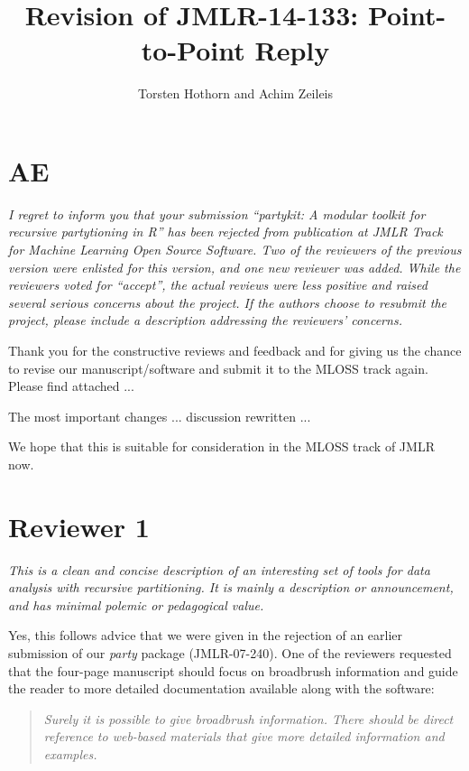 \documentclass{article}
\title{Revision of JMLR-14-133: Point-to-Point Reply}
\author{Torsten Hothorn and Achim Zeileis}
\begin{document}
\maketitle

\section*{AE}

\textit{%
I regret to inform you that your submission ``partykit: A modular toolkit
for recursive partytioning in R'' has been rejected from publication at JMLR
Track for Machine Learning Open Source Software.  Two of the reviewers of
the previous version were enlisted for this version, and one new reviewer
was added.  While the reviewers voted for ``accept'', the actual reviews
were less positive and raised several serious concerns about the project. 
If the authors choose to resubmit the project, please include a description
addressing the reviewers' concerns.
}

\smallskip

Thank you for the constructive reviews and feedback and for giving us the
chance to revise our manuscript/software and submit it to the MLOSS track
again. Please find attached ...

The most important changes ... discussion rewritten ...

We hope that this is suitable for consideration in the MLOSS track of JMLR now.

\section*{Reviewer 1}

\textit{%
This is a clean and concise description of an interesting set of tools for
data analysis with recursive partitioning.  It is mainly a description or
announcement, and has minimal polemic or pedagogical value.
}

\smallskip

Yes, this follows advice that we were given in the rejection of an earlier
submission of our \emph{party} package (JMLR-07-240). One of the reviewers
requested that the four-page manuscript should focus on broadbrush
information and guide the reader to more detailed documentation available
along with the software:
\begin{quote} 
\emph{Surely it is possible to give broadbrush information. There should be direct
reference to web-based materials that give more detailed information and examples.}
\end{quote}
\end{document}
